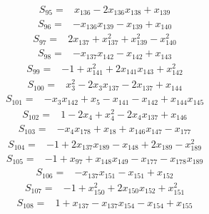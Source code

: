 \begin{align*}
S_{95}={}&x_{136}-2x_{136}x_{138}+x_{139}
\end{align*}
\begin{align*}
S_{96}={}&-x_{136}x_{139}-x_{139}+x_{140}
\end{align*}
\begin{align*}
S_{97}={}&2x_{137}+x_{137}^{2}+x_{139}^{2}-x_{140}^{2}
\end{align*}
\begin{align*}
S_{98}={}&-x_{137}x_{142}-x_{142}+x_{143}
\end{align*}
\begin{align*}
S_{99}={}&-1+x_{141}^{2}+2x_{141}x_{143}+x_{142}^{2}
\end{align*}
\begin{align*}
S_{100}={}&x_{3}^{2}-2x_{3}x_{137}-2x_{137}+x_{144}
\end{align*}
\begin{align*}
S_{101}={}&-x_{3}x_{142}+x_{5}-x_{141}-x_{142}+x_{144}x_{145}
\end{align*}
\begin{align*}
S_{102}={}&1-2x_{4}+x_{4}^{2}-2x_{4}x_{137}+x_{146}
\end{align*}
\begin{align*}
S_{103}={}&-x_{4}x_{178}+x_{18}+x_{146}x_{147}-x_{177}
\end{align*}
\begin{align*}
S_{104}={}&-1+2x_{137}x_{189}-x_{148}+2x_{189}-x_{189}^{2}
\end{align*}
\begin{align*}
S_{105}={}&-1+x_{97}+x_{148}x_{149}-x_{177}-x_{178}x_{189}
\end{align*}
\begin{align*}
S_{106}={}&-x_{137}x_{151}-x_{151}+x_{152}
\end{align*}
\begin{align*}
S_{107}={}&-1+x_{150}^{2}+2x_{150}x_{152}+x_{151}^{2}
\end{align*}
\begin{align*}
S_{108}={}&1+x_{137}-x_{137}x_{154}-x_{154}+x_{155}
\end{align*}
